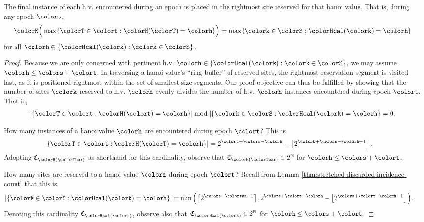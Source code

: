 \begin{lemma}
\label{thm:tilted-last-touched}
The final instance of each h.v. encountered during an epoch is placed in the rightmost site reserved for that hanoi value.
That is, during any epoch $\colort$,
\begin{align*}
\colorK\Big(
  \max\{\colorT \in \colort : \colorH(\colorT) = \colorh\}
\Big)
=
\max\{\colork \in \colorS : \colorHcal(\colork) = \colorh \}
\end{align*}
for all $\colorh \in \{\colorHcal(\colork) : \colork \in \colorS\}$.
\end{lemma}

\begin{proof}
Because we are only concerned with pertinent h.v. $\colorh \in \{\colorHcal(\colork) : \colork \in \colorS\}$, we may assume $\colorh \leq \colors + \colort$.
In traversing a hanoi value's ``ring buffer'' of reserved sites, the rightmost reservation segment is visited last, as it is positioned rightmost within the set of smallest size segments.
Our proof objective can thus be fulfilled by showing that the number of sites $\colork$ reserved to h.v. $\colorh$ evenly divides the number of h.v. $\colorh$ instances encountered during epoch $\colort$.
That is,
\begin{align*}
|\{\colorT \in \colort : \colorH(\colort) = \colorh\}| \bmod |\{\colork \in \colorS : \colorHcal(\colork) = \colorh\} = 0.
\end{align*}

How many instances of a hanoi value $\colorh$ are encountered during epoch $\colort$?
This is
\begin{align*}
|\{\colorT \in \colort : \colorH(\colorT) = \colorh\}|
&=
2^{\colort + \colors - \colorh} - \left\lfloor2^{\colort + \colors - \colorh - 1} \right\rfloor.
\end{align*}
Adopting $\mathfrak{C}_{\colorH(\colorTbar)}$ as shorthand for this cardinality, observe that $\mathfrak{C}_{\colorH(\colorTbar)} \in 2^{\mathbb{N}}$ for $\colorh \leq \colors + \colort$.

How many sites are reserved to a hanoi value $\colorh$ during epoch $\colort$?
Recall from Lemma \ref{thm:stretched-discarded-incidence-count} that this is
\begin{align*}
|\{\colork \in \colorS : \colorHcal(\colork) = \colorh\}|
&=
\min\Big(
\left\lceil 2^{\colors - \colortau - 1} \right\rceil,
2^{\colors + \colort - \colorh} - \left\lfloor 2^{\colors + \colort - \colorh - 1} \right\rfloor
\Big).
\end{align*}
Denoting this cardinality $\mathfrak{C}_{\colorHcal(\colork)}$, observe also that
$\mathfrak{C}_{\colorHcal(\colork)} \in 2^{\mathbb{N}}$ for $\colorh \leq \colors + \colort$.


\end{proof}
